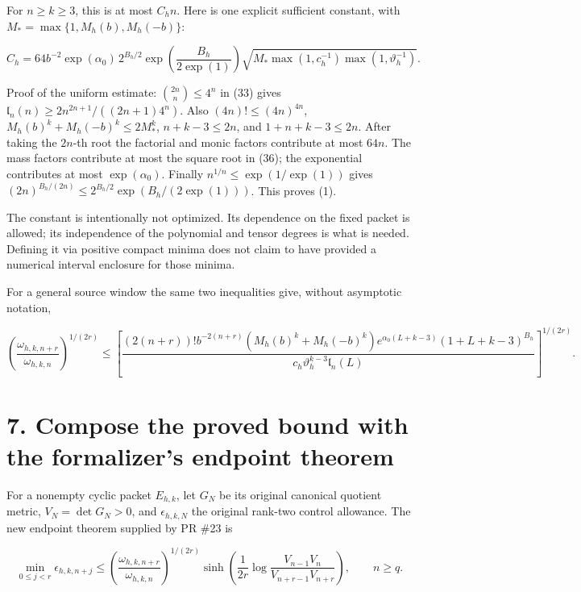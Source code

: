 \documentclass[
  11pt,
]{article}
\begin{document}
For \(n\ge k\ge3\), this is at most \(C_hn\). Here is one explicit
sufficient constant, with \(M_* =\max\{1,M_h(b),M_h(-b)\}\):

\[
 \boxed{
 C_h=64b^{-2}\exp(\alpha_0)\,2^{B_h/2}
       \exp\!\left(\frac{B_h}{2\exp(1)}\right)
       \sqrt{M_*\max(1,c_h^{-1})\max(1,\vartheta_h^{-1})}.
 }                                                                     \tag{36}
\]

Proof of the uniform estimate: \(\binom{2n}{n}\le4^n\) in (33) gives
\(\mathfrak l_n(n)\ge2n^{2n+1}/((2n+1)4^n)\). Also
\((4n)!\le(4n)^{4n}\), \(M_h(b)^k+M_h(-b)^k\le2M_*^k\), \(n+k-3\le2n\),
and \(1+n+k-3\le2n\). After taking the \(2n\)-th root the factorial and
monic factors contribute at most \(64n\). The mass factors contribute at
most the square root in (36); the exponential contributes at most
\(\exp(\alpha_0)\). Finally \(n^{1/n}\le\exp(1/\exp(1))\) gives
\((2n)^{B_h/(2n)}\le2^{B_h/2}\exp(B_h/(2\exp(1)))\). This proves (1).

The constant is intentionally not optimized. Its dependence on the fixed
packet is allowed; its independence of the polynomial and tensor degrees
is what is needed. Defining it via positive compact minima does not
claim to have provided a numerical interval enclosure for those minima.

For a general source window the same two inequalities give, without
asymptotic notation,

\[
 \left(\frac{\omega_{h,k,n+r}}{\omega_{h,k,n}}\right)^{1/(2r)}
 \le\left[
 \frac{(2(n+r))!b^{-2(n+r)}(M_h(b)^k+M_h(-b)^k)
       e^{\alpha_0(L+k-3)}(1+L+k-3)^{B_h}}
      {c_h\vartheta_h^{k-3}\mathfrak l_n(L)}
       \right]^{1/(2r)}.                                               \tag{37}
\]

\section{7. Compose the proved bound with the formalizer's endpoint
theorem}\label{compose-the-proved-bound-with-the-formalizers-endpoint-theorem}

For a nonempty cyclic packet \(E_{h,k}\), let \(G_N\) be its original
canonical quotient metric, \(V_N=\det G_N>0\), and \(\epsilon_{h,k,N}\)
the original rank-two control allowance. The new endpoint theorem
supplied by PR \#23 is

\[
 \min_{0\le j<r}\epsilon_{h,k,n+j}
 \le
 \left(\frac{\omega_{h,k,n+r}}{\omega_{h,k,n}}\right)^{1/(2r)}
 \sinh\!\left(\frac1{2r}
       \log\frac{V_{n-1}V_n}{V_{n+r-1}V_{n+r}}\right),\qquad n\ge q.
                                                                         \tag{38}
\]
\end{document}
